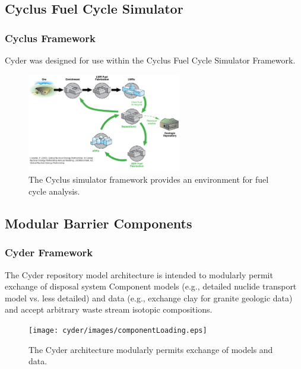 
\subsection{Cyclus Fuel Cycle Simulator}

\begin{frame}[ctb!]
  \frametitle{Cyclus Framework}
  \footnotesize{
  Cyder was designed for use within the Cyclus Fuel Cycle Simulator Framework.
  \begin{figure}[htb!]
    \begin{center}
      \includegraphics[width=0.6\textwidth]{./cyder/images/simulations.eps}
    \end{center}
    \caption{The Cyclus simulator framework provides an environment for fuel 
    cycle analysis.}
    \label{fig:simulations}
  \end{figure}
}
\end{frame}

\subsection{Modular Barrier Components}

\begin{frame}[ctb!]
  \frametitle{Cyder Framework}
  \footnotesize{
The Cyder repository model architecture is intended to modularly permit 
exchange of disposal system Component models (e.g., detailed nuclide transport 
model vs. less detailed) and data (e.g., exchange clay for granite geologic 
data) and accept arbitrary waste stream isotopic compositions.  
  \begin{figure}[htbp!]
    \begin{center}
      \texttt{[image: cyder/images/componentLoading.eps]}
      \caption{The Cyder architecture modularly permits exchange of models and data.}
    \end{center}
  \end{figure}
}
\end{frame}


